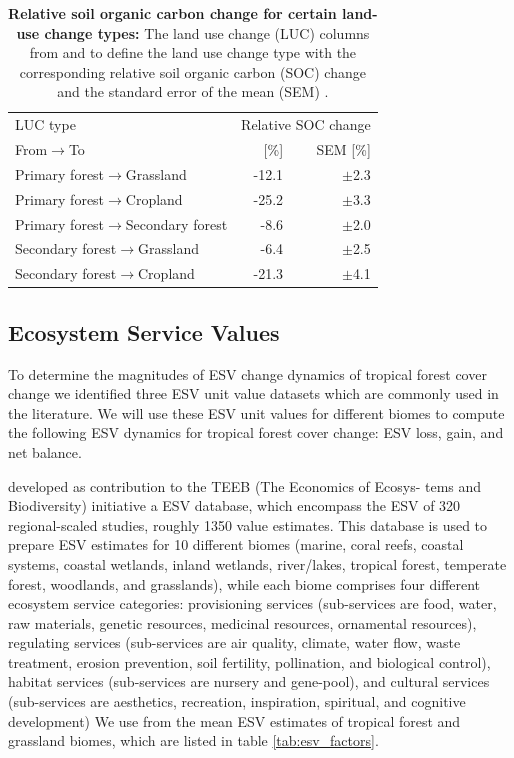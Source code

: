 		\begin{table}[ht]
			\centering
			\caption[Relative soil organic carbon change for certain land-use change types]{\textbf{Relative soil organic carbon change for certain land-use change types:} The land use change (LUC) columns from and to define the land use change type with the corresponding relative soil organic carbon (SOC) change and the standard error of the mean (SEM) \citep{Don2010}.}
			\label{tab:soc_factors}
			\begin{tabular}{lrr}
				\hline
				LUC type & \multicolumn{2}{c}{Relative SOC change} \\\cline{2-3}
				From$\rightarrow$To & [\%] & SEM [\%] \\\hline
				Primary forest$\rightarrow$Grassland & -12.1 & $\pm$2.3 \\
				Primary forest$\rightarrow$Cropland & -25.2 & $\pm$3.3 \\
				Primary forest$\rightarrow$Secondary forest & -8.6 & $\pm$2.0 \\
				Secondary forest$\rightarrow$Grassland & -6.4 & $\pm$2.5 \\
				Secondary forest$\rightarrow$Cropland & -21.3 & $\pm$4.1 \\\hline
			\end{tabular}
		\end{table}

	\subsection{Ecosystem Service Values}
	\label{subsec:methods_data_esv}
		To determine the magnitudes of \ac{ESV} change dynamics of tropical forest cover change we identified three \ac{ESV} unit value datasets which are commonly used in the literature. We will use these \ac{ESV} unit values for different biomes to compute the following \ac{ESV} dynamics for tropical forest cover change: \ac{ESV} loss, gain, and net balance.

		\citet{Groot2012} developed as contribution to the TEEB (The Economics of Ecosys-
		tems and Biodiversity) initiative a \ac{ESV} database, which encompass the \ac{ESV} of 320 regional-scaled studies, roughly 1350 value estimates. This database is used to prepare \ac{ESV} estimates for 10 different biomes (marine, coral reefs, coastal systems, coastal wetlands, inland wetlands, river/lakes, tropical forest, temperate forest, woodlands, and grasslands), while each biome comprises four different ecosystem service categories: provisioning services (sub-services are food, water, raw materials, genetic resources, medicinal resources, ornamental resources), regulating services (sub-services are air quality, climate, water flow, waste treatment, erosion prevention, soil fertility, pollination, and biological control), habitat services (sub-services are nursery and gene-pool), and cultural services (sub-services are aesthetics, recreation, inspiration, spiritual, and cognitive development) We use from \citeauthor{Groot2012} the mean \ac{ESV} estimates of tropical forest and grassland biomes, which are listed in table \ref{tab:esv_factors}.

